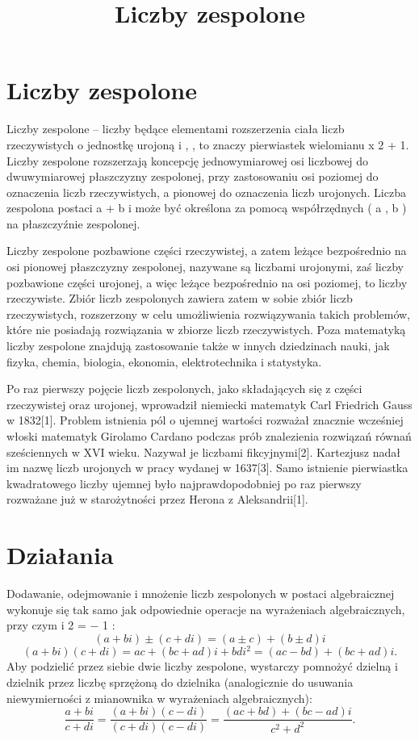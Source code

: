 \documentclass{article}
\begin{document}
\title{Liczby zespolone}
\maketitle

\section{Liczby zespolone}
Liczby zespolone – liczby będące elementami rozszerzenia ciała liczb rzeczywistych o jednostkę urojoną i , , to znaczy pierwiastek wielomianu x 2 + 1. Liczby zespolone rozszerzają koncepcję jednowymiarowej osi liczbowej do dwuwymiarowej płaszczyzny zespolonej, przy zastosowaniu osi poziomej do oznaczenia liczb rzeczywistych, a pionowej do oznaczenia liczb urojonych. Liczba zespolona postaci a + b i  może być określona za pomocą współrzędnych ( a , b ) na płaszczyźnie zespolonej.

Liczby zespolone pozbawione części rzeczywistej, a zatem leżące bezpośrednio na osi pionowej płaszczyzny zespolonej, nazywane są liczbami urojonymi, zaś liczby pozbawione części urojonej, a więc leżące bezpośrednio na osi poziomej, to liczby rzeczywiste. Zbiór liczb zespolonych zawiera zatem w sobie zbiór liczb rzeczywistych, rozszerzony w celu umożliwienia rozwiązywania takich problemów, które nie posiadają rozwiązania w zbiorze liczb rzeczywistych. Poza matematyką liczby zespolone znajdują zastosowanie także w innych dziedzinach nauki, jak fizyka, chemia, biologia, ekonomia, elektrotechnika i statystyka.

Po raz pierwszy pojęcie liczb zespolonych, jako składających się z części rzeczywistej oraz urojonej, wprowadził niemiecki matematyk Carl Friedrich Gauss w 1832[1]. Problem istnienia pól o ujemnej wartości rozważał znacznie wcześniej włoski matematyk Girolamo Cardano podczas prób znalezienia rozwiązań równań sześciennych w XVI wieku. Nazywał je liczbami fikcyjnymi[2]. Kartezjusz nadał im nazwę liczb urojonych w pracy wydanej w 1637[3]. Samo istnienie pierwiastka kwadratowego liczby ujemnej było najprawdopodobniej po raz pierwszy rozważane już w starożytności przez Herona z Aleksandrii[1]. 
\section{Działania}
Dodawanie, odejmowanie i mnożenie liczb zespolonych w postaci algebraicznej wykonuje się tak samo jak odpowiednie operacje na wyrażeniach algebraicznych, przy czym i 2 = − 1 :
$$(a+bi)\pm (c+di)=(a\pm c)+(b\pm d)i$$
$${ (a+bi)(c+di)=ac+(bc+ad)i+bdi^{2}=(ac-bd)+(bc+ad)i.}$$
Aby podzielić przez siebie dwie liczby zespolone, wystarczy pomnożyć dzielną i dzielnik przez liczbę sprzężoną do dzielnika (analogicznie do usuwania niewymierności z mianownika w wyrażeniach algebraicznych): 
$${ {\frac {a+bi}{c+di}}={\frac {(a+bi)(c-di)}{(c+di)(c-di)}}={\frac {(ac+bd)+(bc-ad)i}{c^{2}+d^{2}}}.}$$
\end{document}
